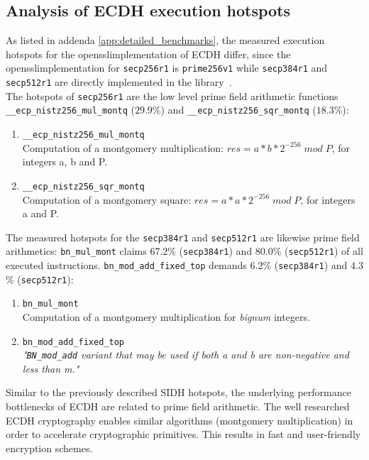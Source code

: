 \subsection{Analysis of \gls{ECDH} execution hotspots}

As listed in addenda \ref{app:detailed_benchmarks}, the measured execution hotspots for the \gls{openssl}implementation of \gls{ECDH} differ, since the \gls{openssl}implementation for \texttt{secp256r1} is \texttt{prime256v1} while \texttt{secp384r1} and \texttt{secp512r1} are directly implemented in the library~\parencite{turner2009elliptic}.\\
The hotspots of \texttt{secp256r1} are the low level prime field arithmetic functions \texttt{\_\_ecp\_nistz256\_mul\_montq} ($29.9$\%) and \texttt{\_\_ecp\_nistz256\_sqr\_montq} ($18.3$\%):
\begin{enumerate}
\item \texttt{\_\_ecp\_nistz256\_mul\_montq}\\Computation of a montgomery multiplication: $res = a*b*2^{-256}\;mod\;P$, for integers a, b and P.
\item \texttt{\_\_ecp\_nistz256\_sqr\_montq} \\Computation of a montgomery square: $res = a*a*2^{-256}\;mod\;P$, for integers a and P.
\end{enumerate}
The measured hotspots for the \texttt{secp384r1} and \texttt{secp512r1} are likewise prime field arithmetics: \texttt{bn\_mul\_mont} claims $67.2$\% (\texttt{secp384r1}) and $80.0$\% (\texttt{secp512r1}) of all executed instructions. \texttt{bn\_mod\_add\_fixed\_top} demands $6.2$\% (\texttt{secp384r1}) and $4.3$\% (\texttt{secp512r1}):
\begin{enumerate}
\item \texttt{bn\_mul\_mont}\\Computation of a montgomery multiplication for \textit{bignum} integers.
\item \texttt{bn\_mod\_add\_fixed\_top}\\\textit{"\texttt{BN\_mod\_add} variant that may be used if both a and b are non-negative and less than m."}
\end{enumerate}
Similar to the previously described \gls{SIDH} hotspots, the underlying performance bottlenecks of \gls{ECDH} are related to prime field arithmetic. The well researched \gls{ECDH} cryptography enables similar  algorithms (montgomery multiplication) in order to accelerate cryptographic primitives. This results in fast and user-friendly encryption schemes.
